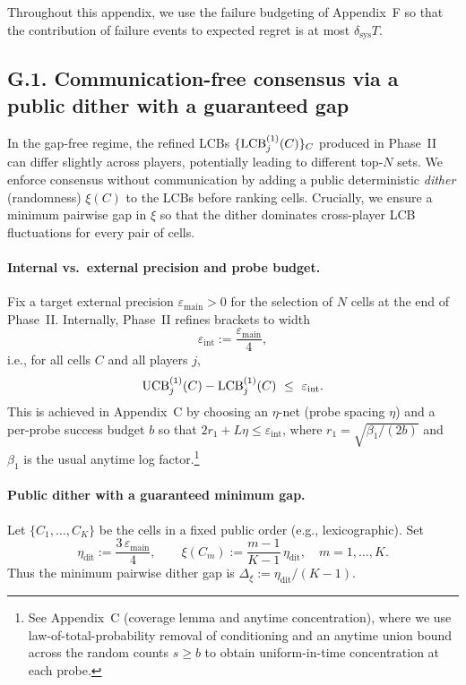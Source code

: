 Throughout this appendix, we use the failure budgeting of Appendix~F so that the contribution of failure events to expected regret is at most $\delta_{\text{sys}}T$.



\subsection*{G.1.\; Communication-free consensus via a public dither with a guaranteed gap}
\label{subsec:public-dither}

In the gap-free regime, the refined LCBs $\{\operatorname{LCB}^{(1)}_j(C)\}_C$ produced in Phase~II can differ slightly across players, potentially leading to different top-$N$ sets. We enforce consensus without communication by adding a public deterministic \emph{dither} (randomness) $\xi(C)$ to the LCBs before ranking cells. Crucially, we ensure a minimum pairwise gap in $\xi$ so that the dither dominates cross-player LCB fluctuations for every pair of cells.

\paragraph{Internal vs.\ external precision and probe budget.}
Fix a target external precision $\varepsilon_{\text{main}}>0$ for the selection of $N$ cells at the end of Phase~II. Internally, Phase~II refines brackets to width
\[
\varepsilon_{\mathrm{int}}:=\frac{\varepsilon_{\text{main}}}{4},
\]
i.e., for all cells $C$ and all players $j$,
\[
\UCB^{(1)}_j(C)-\LCB^{(1)}_j(C)\ \le\ \varepsilon_{\mathrm{int}}.
\]
This is achieved in Appendix~C by choosing an $\eta$-net (probe spacing $\eta$) and a per-probe success budget $b$ so that $2r_1+L\eta\le \varepsilon_{\mathrm{int}}$, where $r_1=\sqrt{\beta_1/(2b)}$ and $\beta_1$ is the usual anytime log factor.\footnote{See Appendix~C (coverage lemma and anytime concentration), where we use law-of-total-probability removal of conditioning and an anytime union bound across the random counts $s\ge b$ to obtain uniform-in-time concentration at each probe.}

\paragraph{Public dither with a guaranteed minimum gap.}
Let $\{C_1,\dots,C_K\}$ be the cells in a fixed public order (e.g., lexicographic). Set
\[
\eta_{\mathrm{dit}}:=\frac{3\,\varepsilon_{\text{main}}}{4},
\qquad
\xi(C_m):=\frac{m-1}{K-1}\,\eta_{\mathrm{dit}},\quad m=1,\dots,K.
\]
Thus the minimum pairwise dither gap is $\Delta_\xi:=\eta_{\mathrm{dit}}/(K-1)$. 


